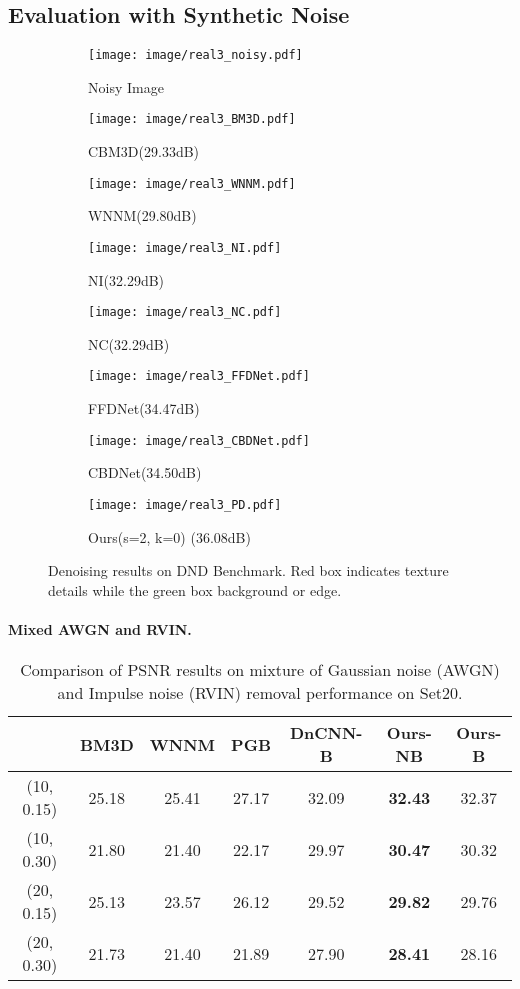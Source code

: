 \documentclass[letterpaper]{article} \usepackage{aaai20}  \usepackage{times}  \usepackage{helvet} \usepackage{courier}  \usepackage{comment}
\begin{document}
\subsection{Evaluation with Synthetic Noise}
\begin{figure*}[t]
	\centering
	\begin{subfigure}{0.24\linewidth} 
		\texttt{[image: image/real3\_noisy.pdf]}
		\caption{Noisy Image} \end{subfigure}
	\begin{subfigure}{0.24\linewidth} 
		\texttt{[image: image/real3\_BM3D.pdf]}
		\caption{CBM3D(29.33dB)} \end{subfigure}
	\begin{subfigure}{0.24\linewidth} 
		\texttt{[image: image/real3\_WNNM.pdf]}
		\caption{WNNM(29.80dB)} \end{subfigure}
	\begin{subfigure}{0.24\linewidth} 
		\texttt{[image: image/real3\_NI.pdf]}
		\caption{NI(32.29dB)} \end{subfigure}
	\begin{subfigure}{0.24\linewidth} 
		\texttt{[image: image/real3\_NC.pdf]}
		\caption{NC(32.29dB)} \end{subfigure}
	\begin{subfigure}{0.24\linewidth} 
		\texttt{[image: image/real3\_FFDNet.pdf]}
		\caption{FFDNet(34.47dB)} \end{subfigure}
	\begin{subfigure}{0.24\linewidth} 
		\texttt{[image: image/real3\_CBDNet.pdf]}
		\caption{CBDNet(34.50dB)} \end{subfigure}
	\begin{subfigure}{0.24\linewidth} 
		\texttt{[image: image/real3\_PD.pdf]}
		\caption{Ours(s=2, k=0) (36.08dB)} \end{subfigure}
	\caption{Denoising results on DND Benchmark. Red box indicates texture details while the green box background or edge.} \label{fig:real2}
\end{figure*}
\paragraph{Mixed AWGN and RVIN.}

\begin{table}[ht]\setlength{\tabcolsep}{2pt}
\centering
\small
\caption{Comparison of PSNR results on mixture of Gaussian noise (AWGN) and Impulse noise (RVIN) removal performance on Set20.}
\begin{tabular}{|c|c|c|c|c|c|c|}
\hline
 & BM3D & WNNM& PGB & DnCNN-B &Ours-NB & Ours-B\\ \hline 
(10, 0.15)&25.18&25.41&27.17&32.09&\bf32.43&32.37\\
(10, 0.30)&21.80&21.40&22.17&29.97&\bf30.47&30.32\\
(20, 0.15)&25.13&23.57&26.12&29.52&\bf29.82&29.76\\
(20, 0.30)&21.73&21.40&21.89&27.90&\bf28.41&28.16\\
\hline
\end{tabular}
\label{exp:Mix}
\end{table}
\end{document}
